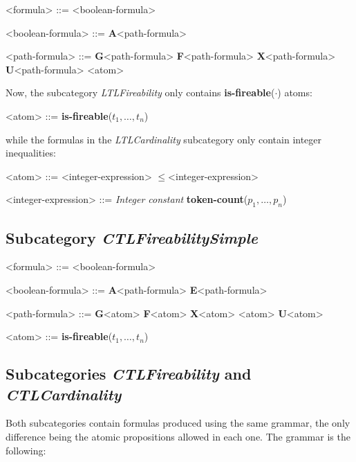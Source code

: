 \documentclass[10pt,english,a4paper]{article}
\newcommand\ctla             {\textbf{A}\xspace}
\newcommand\ctle             {\textbf{E}\xspace}
\newcommand\ltlf             {\textbf{F}\xspace}
\newcommand\ltlg             {\textbf{G}\xspace}
\newcommand\ltlx             {\textbf{X}\xspace}
\newcommand\ltlu             {\textbf{U}\xspace}
\newcommand\atomleq          {\boldmath$\leq$\xspace}
\newcommand\atomisfire[1]    {\textbf{is-fireable}(#1)}
\newcommand\atomtokenscnt[1] {\textbf{token-count}(#1)}
\begin{document}
\begin{grammar}

<formula> ::= <boolean-formula>

<boolean-formula> ::= \ctla <path-formula>

<path-formula> ::=
     \ltlg <path-formula>
\alt \ltlf <path-formula>
\alt \ltlx <path-formula>
 \ltlu <path-formula>
\alt <atom>

\end{grammar}

Now, the subcategory \emph{LTLFireability} only contains
\atomisfire{$\cdot$} atoms:

\begin{grammar}
<atom> ::= \atomisfire{$t_1, \ldots, t_n$}
\end{grammar}

while the formulas in the \emph{LTLCardinality} subcategory only contain
integer inequalities:

\begin{grammar}
<atom> ::= <integer-expression> \atomleq <integer-expression>

<integer-expression> ::= \textit{Integer constant}
\alt \atomtokenscnt{$p_1, \ldots, p_n$}
\end{grammar}


\subsection{Subcategory \textit{CTLFireabilitySimple}}

\begin{grammar}
<formula> ::= <boolean-formula>

<boolean-formula> ::= \ctla <path-formula>
\alt \ctle <path-formula>

<path-formula> ::=
     \ltlg <atom>
\alt \ltlf <atom>
\alt \ltlx <atom>
\alt <atom> \ltlu <atom>

<atom> ::= \atomisfire{$t_1, \ldots, t_n$}
\end{grammar}

\subsection{Subcategories \emph{CTLFireability} and \emph{CTLCardinality}}

Both subcategories contain formulas produced using the same grammar, the
only difference being the atomic propositions allowed in each one.
The grammar is the following:
\end{document}
